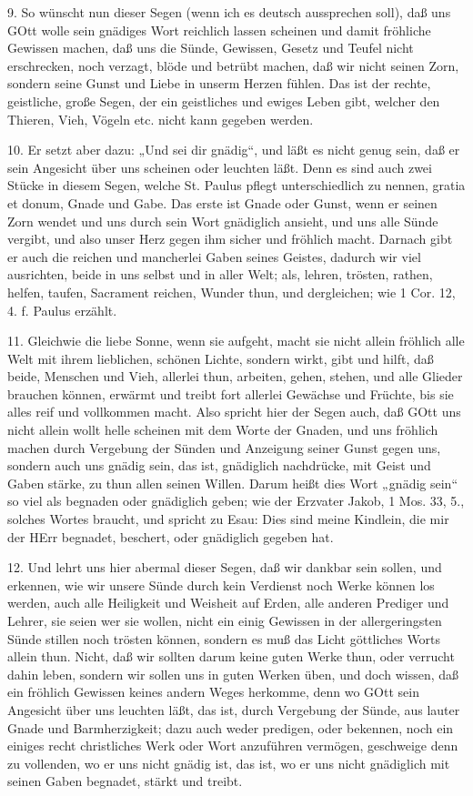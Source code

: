 9. So wünscht nun dieser Segen (wenn ich es deutsch aussprechen soll), daß uns GOtt wolle sein gnädiges Wort reichlich lassen scheinen und damit fröhliche Gewissen machen, daß uns die Sünde, Gewissen, Gesetz und Teufel nicht erschrecken, noch verzagt, blöde und betrübt machen, daß wir nicht seinen Zorn, sondern seine Gunst und Liebe in unserm Herzen fühlen. Das ist der rechte, geistliche, große Segen, der ein geistliches und ewiges Leben gibt, welcher den Thieren, Vieh, Vögeln etc. nicht kann gegeben werden.

10. Er setzt aber dazu: „Und sei dir gnädig“, und läßt es nicht genug sein, daß er sein Angesicht über uns scheinen oder leuchten läßt. Denn es sind auch zwei Stücke in diesem Segen, welche St. Paulus pflegt unterschiedlich zu nennen, gratia et donum, Gnade und Gabe. Das erste ist Gnade oder Gunst, wenn er seinen Zorn wendet und uns durch sein Wort gnädiglich ansieht, und uns alle Sünde vergibt, und also unser Herz gegen ihm sicher und fröhlich macht. Darnach gibt er auch die reichen und mancherlei Gaben seines Geistes, dadurch wir viel ausrichten, beide in uns selbst und in aller Welt; als, lehren, trösten, rathen, helfen, taufen, Sacrament reichen, Wunder thun, und dergleichen; wie 1 Cor. 12, 4. f. Paulus erzählt.

11. Gleichwie die liebe Sonne, wenn sie aufgeht, macht sie nicht allein fröhlich alle Welt mit ihrem lieblichen, schönen Lichte, sondern wirkt, gibt und hilft, daß beide, Menschen und Vieh, allerlei thun, arbeiten, gehen, stehen, und alle Glieder brauchen können, erwärmt und treibt fort allerlei Gewächse und Früchte, bis sie alles reif und vollkommen macht. Also spricht hier der Segen auch, daß GOtt uns nicht allein wollt helle scheinen mit dem Worte der Gnaden, und uns fröhlich machen durch Vergebung der Sünden und Anzeigung seiner Gunst gegen uns, sondern auch uns gnädig sein, das ist, gnädiglich nachdrücke, mit Geist und Gaben stärke, zu thun allen seinen Willen. Darum heißt dies Wort „gnädig sein“ so viel als begnaden oder gnädiglich geben; wie der Erzvater Jakob, 1 Mos. 33, 5., solches Wortes braucht, und spricht zu Esau: Dies sind meine Kindlein, die mir der HErr begnadet, beschert, oder gnädiglich gegeben hat.

12. Und lehrt uns hier abermal dieser Segen, daß wir dankbar sein sollen, und erkennen, wie wir unsere Sünde durch kein Verdienst noch Werke können los werden, auch alle Heiligkeit und Weisheit auf Erden, alle anderen Prediger und Lehrer, sie seien wer sie wollen, nicht ein einig Gewissen in der allergeringsten Sünde stillen noch trösten können, sondern es muß das Licht göttliches Worts allein thun. Nicht, daß wir sollten darum keine guten Werke thun, oder verrucht dahin leben, sondern wir sollen uns in guten Werken üben, und doch wissen, daß ein fröhlich Gewissen keines andern Weges herkomme, denn wo GOtt sein Angesicht über uns leuchten läßt, das ist, durch Vergebung der Sünde, aus lauter Gnade und Barmherzigkeit; dazu auch weder predigen, oder bekennen, noch ein einiges recht christliches Werk oder Wort anzuführen vermögen, geschweige denn zu vollenden, wo er uns nicht gnädig ist, das ist, wo er uns nicht gnädiglich mit seinen Gaben begnadet, stärkt und treibt.

